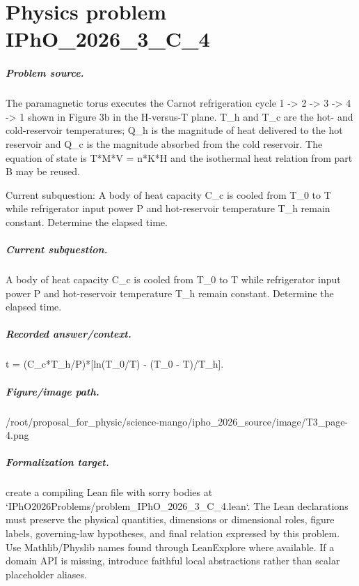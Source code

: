 
\chapter{Physics problem IPhO\_2026\_3\_C\_4}
\label{ch:IPhO2026Problems_problem_IPhO_2026_3_C_4}

\paragraph{Problem source.}
The paramagnetic torus executes the Carnot refrigeration cycle
1 -> 2 -> 3 -> 4 -> 1 shown in Figure 3b in the H-versus-T plane.  T\_h and T\_c
are the hot- and cold-reservoir temperatures; Q\_h is the magnitude of heat
delivered to the hot reservoir and Q\_c is the magnitude absorbed from the cold
reservoir.  The equation of state is T*M*V = n*K*H and the isothermal heat
relation from part B may be reused.

Current subquestion:
A body of heat capacity C\_c is cooled from T\_0 to T while refrigerator input power P and hot-reservoir temperature T\_h remain constant. Determine the elapsed time.

\paragraph{Current subquestion.}
A body of heat capacity C\_c is cooled from T\_0 to T while refrigerator input power P and hot-reservoir temperature T\_h remain constant. Determine the elapsed time.

\paragraph{Recorded answer/context.}
t = (C\_c*T\_h/P)*[ln(T\_0/T) - (T\_0 - T)/T\_h].

\paragraph{Figure/image path.}
/root/proposal\_for\_physic/science-mango/ipho\_2026\_source/image/T3\_page-4.png

\paragraph{Formalization target.}
create a compiling Lean file with sorry bodies at `IPhO2026Problems/problem\_IPhO\_2026\_3\_C\_4.lean`.
The Lean declarations must preserve the physical quantities, dimensions or dimensional roles, figure labels, governing-law hypotheses, and final relation expressed by this problem.
Use Mathlib/Physlib names found through LeanExplore where available. If a domain API is missing, introduce faithful local abstractions rather than scalar placeholder aliases.

